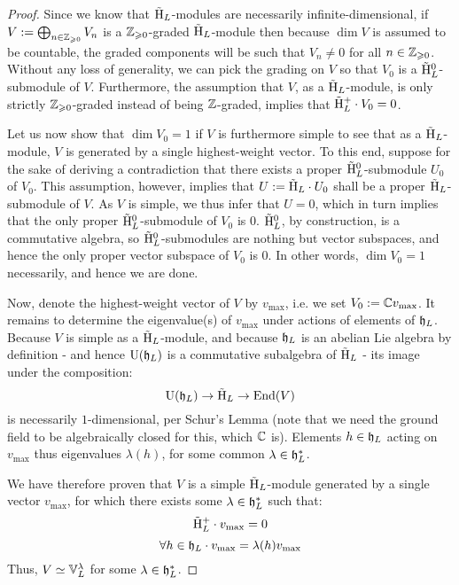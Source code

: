             \begin{proof}
                Since we know that $\tilde{\mathrm{H}}_L$-modules are necessarily infinite-dimensional, if $V := \bigoplus_{n \in \mathbb{Z}_{\geqslant 0}} V_n$ is a $\mathbb{Z}_{\geqslant 0}$-graded $\tilde{\mathrm{H}}_L$-module then because $\dim V$ is assumed to be countable, the graded components will be such that $V_n \not = 0$ for all $n \in \mathbb{Z}_{\geqslant 0}$. Without any loss of generality, we can pick the grading on $V$ so that $V_0$ is a $\tilde{\mathrm{H}}_L^0$-submodule of $V$. Furthermore, the assumption that $V$, as a $\tilde{\mathrm{H}}_L$-module, is only strictly $\mathbb{Z}_{\geqslant 0}$-graded instead of being $\mathbb{Z}$-graded, implies that $\tilde{\mathrm{H}}_L^+ \cdot V_0 = 0$.

                Let us now show that $\dim V_0 = 1$ if $V$ is furthermore simple to see that as a $\tilde{\mathrm{H}}_L$-module, $V$ is generated by a single highest-weight vector. To this end, suppose for the sake of deriving a contradiction that there exists a proper $\tilde{\mathrm{H}}_L^0$-submodule $U_0$ of $V_0$. This assumption, however, implies that $U := \tilde{\mathrm{H}}_L \cdot U_0$ shall be a proper $\tilde{\mathrm{H}}_L$-submodule of $V$. As $V$ is simple, we thus infer that $U = 0$, which in turn implies that the only proper $\tilde{\mathrm{H}}_L^0$-submodule of $V_0$ is $0$. $\tilde{\mathrm{H}}_L^0$, by construction, is a commutative algebra, so $\tilde{\mathrm{H}}_L^0$-submodules are nothing but vector subspaces, and hence the only proper vector subspace of $V_0$ is $0$. In other words, $\dim V_0 = 1$ necessarily, and hence we are done.

                Now, denote the highest-weight vector of $V$ by $v_{\max}$, i.e. we set $V_0 := \mathbb{C} v_{\max}$. It remains to determine the eigenvalue(s) of $v_{\max}$ under actions of elements of $\mathfrak{h}_L$. Because $V$ is simple as a $\tilde{\mathrm{H}}_L$-module, and because $\mathfrak{h}_L$ is an abelian Lie algebra by definition - and hence $\mathrm{U}(\mathfrak{h}_L)$ is a commutative subalgebra of $\tilde{\mathrm{H}}_L$ - its image under the composition:
                    $$\mathrm{U}(\mathfrak{h}_L) \to \tilde{\mathrm{H}}_L \to \mathrm{End}(V)$$
                is necessarily $1$-dimensional, per Schur's Lemma (note that we need the ground field to be algebraically closed for this, which $\mathbb{C}$ is). Elements $h \in \mathfrak{h}_L$ acting on $v_{\max}$ thus eigenvalues $\lambda(h)$, for some common $\lambda \in \mathfrak{h}_L^*$. 

                We have therefore proven that $V$ is a simple $\tilde{\mathrm{H}}_L$-module generated by a single vector $v_{\max}$, for which there exists some $\lambda \in \mathfrak{h}_L^*$ such that:
                    $$\tilde{\mathrm{H}}_L^+ \cdot v_{\max} = 0$$
                    $$\forall h \in \mathfrak{h}_L \cdot v_{\max} = \lambda(h) v_{\max}$$
                Thus, $V \simeq \mathbb{V}_L^{\lambda}$ for some $\lambda \in \mathfrak{h}_L^*$.
            \end{proof}

